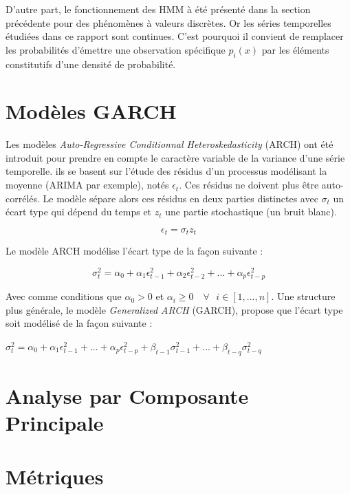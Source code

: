 \documentclass[12pt]{report}
\begin{document}
D'autre part, le fonctionnement des HMM à été présenté dans la section précédente pour des phénomènes à valeurs discrètes. Or les séries temporelles étudiées dans ce rapport sont continues. C'est pourquoi il convient de remplacer les probabilités d'émettre une observation spécifique $p_i(x)$ par les éléments constitutifs d'une densité de probabilité.


\section{Modèles GARCH}
Les modèles \textit{Auto-Regressive Conditionnal Heteroskedasticity} (ARCH) ont été introduit pour prendre en compte le caractère variable de la variance d'une série temporelle. ils se basent sur l'étude des résidus d'un processus modélisant la moyenne (ARIMA par exemple), notés $\epsilon_t$. Ces résidus ne doivent plus être auto-corrélés. Le modèle sépare alors ces résidus en deux parties distinctes avec $\sigma_t$ un écart type qui dépend du temps et $z_t$ une partie stochastique (un bruit blanc).

\begin{equation}
\epsilon_t = \sigma_t  z_t
\end{equation}

Le modèle ARCH modélise l'écart type de la façon suivante :

\begin{equation}
\sigma_t^2 = \alpha_0 + \alpha_1  \epsilon_{t-1}^2 + \alpha_2  \epsilon_{t-2}^2 + ... + \alpha_p  \epsilon_{t-p}^2 
\label{ARCH}
\end{equation}

Avec comme conditions que $\alpha_0 > 0$ et $\alpha_i \geq 0 \quad \forall \text{ } i \in [1,...,n] $. Une structure plus générale, le modèle \textit{Generalized ARCH} (GARCH), propose que l’écart type soit modélisé de la façon suivante :

$ \sigma_t^2 = \alpha_0 + \alpha_1  \epsilon_{t-1}^2 + ... + \alpha_p  \epsilon_{t-p}^2
+ \beta_{t-1} \sigma^2_{t-1} + ... + \beta_{t-q} \sigma^2_{t-q}$




\section{Analyse par Composante Principale}
\label{sec:Model_ACP}

\section{Métriques}
\end{document}
